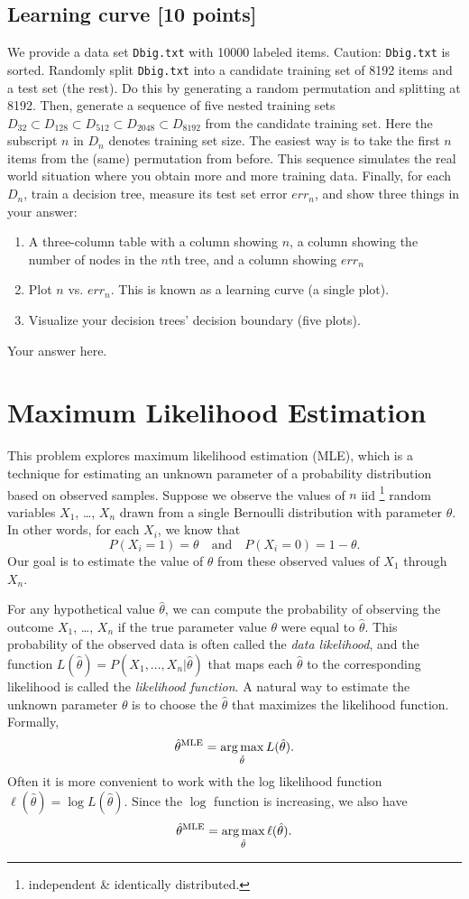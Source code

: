 \documentclass[a4paper]{article}
\theoremstyle{definition}
\DeclareMathOperator*{\argmax}{arg\,max}
\newcommand \mle [1]{{\hat #1}^{\rm MLE}}
\begin{document}
\subsection{Learning curve [10 points]}\label{curve}
We provide a data set {\tt Dbig.txt} with 10000 labeled items. Caution: {\tt Dbig.txt} is sorted.
Randomly split {\tt Dbig.txt} into a candidate training set of 8192 items and a test set (the rest).  Do this by generating a random permutation and splitting at 8192.
Then, generate a sequence of five nested training sets $D_{32} \subset D_{128} \subset D_{512} \subset D_{2048} \subset D_{8192}$ from the candidate training set. 
Here the subscript $n$ in $D_n$ denotes training set size. 
The easiest way is to take the first $n$ items from the (same) permutation from before.
This sequence simulates the real world situation where you obtain more and more training data.
Finally, for each $D_n$, train a decision tree, measure its test set error $err_n$, and show three things in your answer: 
\begin{enumerate}
	\item A three-column table with a column showing $n$, a column showing the number of nodes in the $n$th tree, and a column showing $err_n$
	\item Plot $n$ vs. $err_n$. This is known as a learning curve (a single plot).
	\item Visualize your decision trees' decision boundary (five plots).
\end{enumerate}
{\color{blue} Your answer here.}

\newpage
\section{Maximum Likelihood Estimation}


This problem explores maximum likelihood estimation (MLE), which is a technique for estimating an unknown parameter of a probability distribution based on observed samples. 
Suppose we observe the values of $n$ iid \footnote{independent \& identically distributed.} random variables $X_1$, \dots, $X_n$ drawn from a single Bernoulli distribution with parameter $\theta$. 
In other words, for each $X_i$, we know that 
\[
P(X_i = 1) = \theta\quad\text{and}\quad P(X_i = 0) = 1 - \theta.
\]
Our goal is to estimate the value of $\theta$ from these observed values of $X_1$ through $X_n$.


For any hypothetical value $\hat \theta$, we can compute the probability of observing the outcome $X_1$, \dots, $X_n$ if the true parameter value $\theta$ were equal to $\hat \theta$.
This probability of the observed data is often called the {\em data likelihood}, and the function $L(\hat \theta)=P(X_1, \dots, X_n|\hat{\theta})$ that maps each $\hat \theta$ to the corresponding likelihood is called the \emph{likelihood function}.  
A natural way to estimate the unknown parameter $\theta$ is to choose the $\hat \theta$ that maximizes the likelihood function. 
Formally,
\[
\mle{\theta} = \argmax_{\hat \theta} L(\hat \theta).
\]
Often it is more convenient to work with the log likelihood function $\ell(\hat \theta) = \log L(\hat \theta)$. 
Since the $\log$ function is increasing, we also have
\[
\mle{\theta} = \argmax_{\hat \theta} \ell(\hat \theta).
\]
\end{document}
